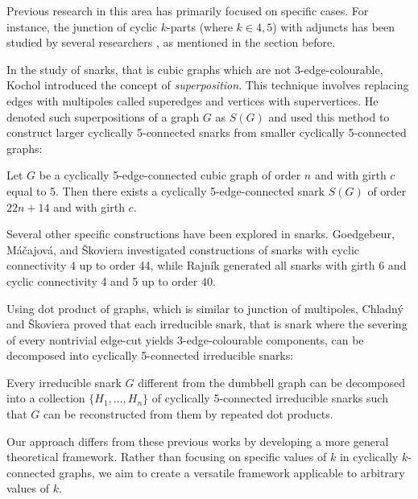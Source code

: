 \documentclass[12pt, twoside]{book}
\begin{document}
Previous research in this area has primarily focused on specific cases. For instance, the junction of cyclic $k$-parts (where $k\in{4,5}$) with adjuncts has been studied by several researchers \cite{Rajnik_phd, Andersen1988}, as mentioned in the section before.

In the study of snarks, that is cubic graphs which are not 3-edge-colourable, Kochol introduced the concept of \textit{superposition}. This technique involves replacing edges with multipoles called superedges and vertices with supervertices. He denoted such superpositions of a graph $G$ as $S(G)$ and used this method to construct larger cyclically 5-connected snarks from smaller cyclically 5-connected graphs:

\begin{theorem}
	Let $G$ be a cyclically 5-edge-connected cubic graph of order $n$ and with girth $c$ equal to 5. Then there exists a cyclically 5-edge-connected snark $S(G)$ of order $22n+14$ and with girth $c$.
\end{theorem}

Several other specific constructions have been explored in snarks. Goedgebeur, Máčajová, and Škoviera \cite{Goedgebeur2019, Goedgebeur2020} investigated constructions of snarks with cyclic connectivity 4 up to order 44, while Rajník \cite{Rajnik_mgr} generated all snarks with girth 6 and cyclic connectivity 4 and 5 up to order 40.

Using dot product of graphs, which is similar to junction of multipoles, Chladný and Škoviera \cite{Chladny2010} proved that each irreducible snark, that is snark where the severing of every nontrivial edge-cut yields 3-edge-colourable components, can be decomposed into cyclically 5-connected irreducible snarks:

\begin{theorem}
	Every irreducible snark $G$ different from the dumbbell graph can be decomposed into a collection $\{H_1, \dots , H_n\}$ of cyclically 5-connected irreducible snarks such that $G$ can be reconstructed from them by repeated dot products.
\end{theorem}

Our approach differs from these previous works by developing a more general theoretical framework. Rather than focusing on specific values of $k$ in cyclically $k$-connected graphs, we aim to create a versatile framework applicable to arbitrary values of $k$.
\end{document}
